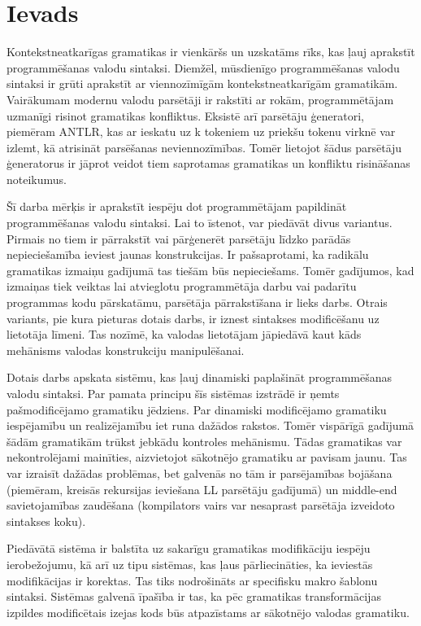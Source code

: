 \section{Ievads}
Kontekstneatkarīgas gramatikas ir vienkāršs un uzskatāms rīks, kas ļauj aprakstīt programmēšanas valodu sintaksi. Diemžēl, mūsdienīgo programmēšanas valodu sintaksi ir grūti aprakstīt ar viennozīmīgām kontekstneatkarīgām gramatikām. Vairākumam modernu valodu parsētāji ir rakstīti ar rokām, programmētājam uzmanīgi risinot gramatikas konfliktus.  Eksistē arī parsētāju ģeneratori, piemēram ANTLR, kas ar ieskatu uz k tokeniem uz priekšu tokenu virknē var izlemt, kā atrisināt parsēšanas neviennozīmības. Tomēr lietojot šādus parsētāju ģeneratorus ir jāprot veidot tiem saprotamas gramatikas un konfliktu risināšanas noteikumus.

Šī darba mērķis ir aprakstīt iespēju dot programmētājam papildināt programmēšanas valodu sintaksi. Lai to īstenot, var piedāvāt divus variantus. Pirmais no tiem ir pārrakstīt vai pārģenerēt parsētāju līdzko parādās nepieciešamība ieviest jaunas konstrukcijas. Ir pašsaprotami, ka radikālu gramatikas izmaiņu gadījumā tas tiešām būs nepieciešams. Tomēr gadījumos, kad izmaiņas tiek veiktas lai atvieglotu programmētāja darbu vai padarītu programmas kodu pārskatāmu, parsētāja pārrakstīšana ir lieks darbs. Otrais variants, pie kura pieturas dotais darbs, ir iznest sintakses modificēšanu uz lietotāja līmeni. Tas nozīmē, ka valodas lietotājam jāpiedāvā kaut kāds mehānisms valodas konstrukciju manipulēšanai.

Dotais darbs apskata sistēmu, kas ļauj dinamiski paplašināt programmēšanas valodu sintaksi. Par pamata principu šīs sistēmas izstrādē ir ņemts pašmodificējamo gramatiku jēdziens. Par dinamiski modificējamo gramatiku iespējamību un realizējamību iet runa dažādos rakstos. Tomēr vispārīgā gadījumā šādām gramatikām trūkst jebkādu kontroles mehānismu. Tādas gramatikas var nekontrolējami mainīties, aizvietojot sākotnējo gramatiku ar pavisam jaunu. Tas var izraisīt dažādas problēmas, bet galvenās no tām ir parsējamības bojāšana (piemēram, kreisās rekursijas ieviešana LL parsētāju gadījumā) un middle-end savietojamības zaudēšana (kompilators vairs var nesaprast parsētāja izveidoto sintakses koku).

Piedāvātā sistēma ir balstīta uz sakarīgu gramatikas modifikāciju iespēju ierobežojumu, kā arī uz tipu sistēmas, kas ļaus pārliecināties, ka ieviestās modifikācijas ir korektas. Tas tiks nodrošināts ar specifisku makro šablonu sintaksi. Sistēmas galvenā īpašība ir tas, ka pēc gramatikas transformācijas izpildes modificētais izejas kods būs atpazīstams ar sākotnējo valodas gramatiku.

